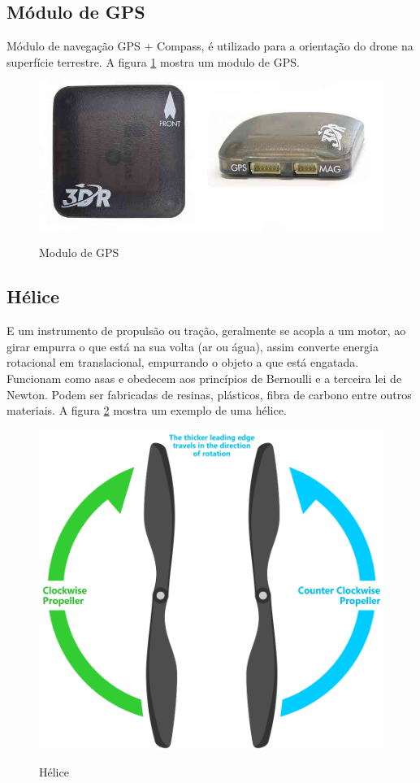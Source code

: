 \subsection{Módulo de GPS}
Módulo de navegação GPS + Compass, é utilizado para a orientação do drone na superfície terrestre. A figura \ref{fig:gps} mostra um modulo de GPS.
\begin{figure}[H]
  \centering
  \caption{Modulo de GPS}
  \includegraphics[scale=.8]{figs/gps.jpg}
  \label{fig:gps}
\end{figure}
\subsection{Hélice}
E um instrumento de propulsão ou tração, geralmente se acopla a um motor, ao girar empurra o que está na sua volta (ar ou água), assim converte energia rotacional em translacional, empurrando o objeto a que está engatada. Funcionam como asas e obedecem aos princípios de Bernoulli e a terceira lei de Newton. Podem ser fabricadas de resinas, plásticos, fibra de carbono entre outros materiais. A figura \ref{fig:helice} mostra um exemplo de uma hélice.
\begin{figure}[H]
  \centering
  \caption{Hélice}
  \includegraphics[scale=.7]{figs/helices.png}
  \label{fig:helice}
\end{figure}
